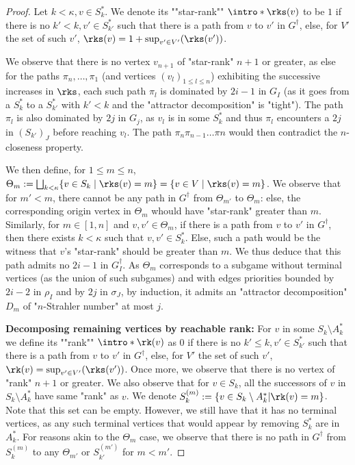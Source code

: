 \documentclass[a4paper,UKenglish,cleveref, autoref, thm-restate]{lipics-v2021}
\renewcommand{\leq}{\leqslant}
\begin{document}
\begin{proof}
	\AP Let $k < \kappa, v \in S^*_k$. We denote its ""star-rank"" $\intro*\rks(v)$ to be $1$ if there is no $k'<k, v'\in S^*_{k'}$ such that there is a path from $v$ to $v'$ in $G^\dagger$, else, for $V'$ the set of such $v'$, $\rks(v) = 1+\sup_{v'\in V'}(\rks(v'))$. 
	
	We observe that there is no vertex $v_{n+1}$ of "star-rank" $n+1$ or greater, as else for the paths $\pi_n, \dots, \pi_1$ (and vertices $(v_l)_{1\leq l\leq n}$) exhibiting the successive increases in $\rks$, each such path $\pi_l$ is dominated by $2i-1$ in $G_I$ (as it goes from a $S^*_k$ to a $S^*_{k'}$ with $k' < k$ and the "attractor decomposition" is "tight"). The path $\pi_l$ is also dominated by $2j$ in $G_j$, as $v_l$ is in some $S^*_k$ and thus $\pi_l$ encounters a $2j$ in $(S_{k'})_J$ before reaching $v_l$. The path $\pi_n \pi_{n-1}\dots \pi{n}$ would then contradict the $n$-closeness property.
	
	We then define, for $1\leq m\leq n$, $\Theta_m := \bigsqcup_{k < \kappa}\{v \in S_k\mid \rks(v) = m\} = \{v\in V \mid \rks(v) = m\}$. We observe that for $m' < m$, there cannot be any path in $G^\dagger$ from $\Theta_{m'}$ to $\Theta_m$: else, the corresponding origin vertex in $\Theta_m$ whould have "star-rank" greater than $m$. 
	Similarly, for $m\in[1,n]$ and $v,v' \in \Theta_m$, if there is a path from $v$ to $v'$ in $G^\dagger$, then there exists $k<\kappa$ such that $v,v' \in S^*_k$. Else, such a path would be the witness that $v$'s "star-rank" should be greater than $m$. We thus deduce that this path admits no $2i-1$ in $G^\dagger_I$.
	As $\Theta_m$ corresponds to a subgame without terminal vertices (as the union of such subgames) and with edges priorities bounded by $2i-2$ in $\rho_I$ and by $2j$ in $\sigma_J$, by induction, it admits an "attractor decomposition" $D_m$ of "$n$-Strahler number" at most $j$.
	
	\textbf{{Decomposing remaining vertices by reachable rank:}} \AP For $v$ in some $S_{k}\setminus A^*_k$ we define its ""rank"" $\intro*\rk(v)$ as $0$ if there is no $k'\leq k, v'\in S^*_{k'}$ such that there is a path from $v$ to $v'$ in $G^\dagger$, else, for $V'$ the set of such $v'$, $\rk(v) = \sup_{v'\in V'}(\rks(v'))$. Once more, we observe that there is no vertex of "rank" $n+1$ or greater. We also observe that for $v\in S_{k}$, all the successors of $v$ in $S_{k}\setminus A^*_k$ have same "rank" as $v$. We denote $S_{k}^{(m)} := \{v\in S_{k}\setminus A^*_k|\rk(v)=m\}$. Note that this set can be empty. However, we still have that it has no terminal vertices, as any such terminal vertices that would appear by removing $S_k^*$ are in $A^*_k$.
	For reasons akin to the $\Theta_m$ case, we observe that there is no path in $G^\dagger$ from $S_{k}^{(m)}$ to any $\Theta_{m'}$ or $S_{k'}^{(m')}$ for $m < m'$.
	

\end{proof}
\end{document}
